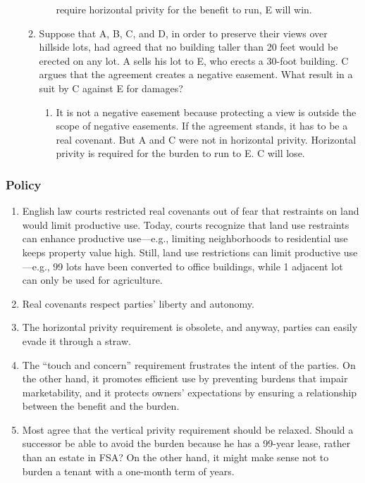 \begin{enumerate}
\begin{enumerate}
\begin{enumerate}
            require horizontal privity for the benefit to run, E will win.
        \end{enumerate}
        \item Suppose that A, B, C, and D, in order to preserve their views 
        over hillside lots, had agreed that no building taller than 20 feet 
        would be erected on any lot. A sells his lot to E, who erects a 
        30-foot building. C argues that the agreement creates a negative 
        easement. What result in a suit by C against E for damages?    
        \begin{enumerate}
            \item It is not a negative easement because protecting a view is 
            outside the scope of negative easements. If the agreement stands, 
            it has to be a real covenant. But A and C were not in horizontal 
            privity. Horizontal privity is required for the burden to run to 
            E. C will lose.
        \end{enumerate}
    \end{enumerate}
\end{enumerate}

\subsubsection{Policy}

\begin{enumerate}
    \item English law courts restricted real covenants out of fear that 
    restraints on land would limit productive use. Today, courts recognize 
    that land use restraints can enhance productive use---e.g., limiting 
    neighborhoods to residential use keeps property value high. Still, land 
    use restrictions can limit productive use---e.g., 99 lots have been 
    converted to office buildings, while 1 adjacent lot can only be used for 
    agriculture.
    \item Real covenants respect parties' liberty and autonomy.
    \item The horizontal privity requirement is obsolete, and anyway, parties 
    can easily evade it through a straw.
    \item The ``touch and concern'' requirement frustrates the intent of the 
    parties. On the other hand, it promotes efficient use by preventing 
    burdens that impair marketability, and it protects owners' expectations by 
    ensuring a relationship between the benefit and the burden.
    \item Most agree that the vertical privity requirement should be relaxed. 
    Should a successor be able to avoid the burden because he has a 99-year 
    lease, rather than an estate in FSA? On the other hand, it might make 
    sense not to burden a tenant with a one-month term of years.
\end{enumerate}

